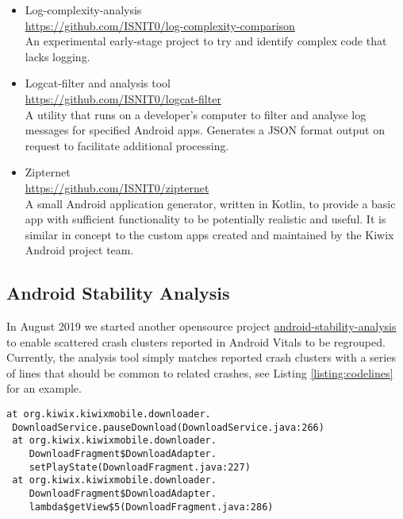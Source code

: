 \begin{itemize}
    \item Log-complexity-analysis\\ \url{https://github.com/ISNIT0/log-complexity-comparison}\\ An experimental early-stage project to try and identify complex code that lacks logging.
    \item Logcat-filter and analysis tool\\ \url{https://github.com/ISNIT0/logcat-filter}\\ A utility that runs on a developer's computer to filter and analyse log messages for specified Android apps. Generates a JSON format output on request to facilitate additional processing.
    
    
    \item Zipternet\\ \url{https://github.com/ISNIT0/zipternet}\\ A small Android application generator, written in Kotlin, to provide a basic app with sufficient functionality to be potentially realistic and useful. It is similar in concept to the custom apps created and maintained by the Kiwix Android project team.
\end{itemize}


\subsection{Android Stability Analysis}
In August 2019 we started another opensource project \href{https://github.com/commercetest/android-stability-analysis}{android-stability-analysis}~\citep{android-stability-analysis} to enable scattered crash clusters reported in Android Vitals to be regrouped. Currently, the analysis tool simply matches reported crash clusters with a series of lines that should be common to related crashes, see Listing \ref{listing:codelines}  for an example.

\begin{lstlisting}[caption=Example of lines to match,label=listing:codelines]
at org.kiwix.kiwixmobile.downloader.
 DownloadService.pauseDownload(DownloadService.java:266)
 at org.kiwix.kiwixmobile.downloader.
    DownloadFragment$DownloadAdapter.
    setPlayState(DownloadFragment.java:227)
 at org.kiwix.kiwixmobile.downloader.
    DownloadFragment$DownloadAdapter.
    lambda$getView$5(DownloadFragment.java:286)
\end{lstlisting}


